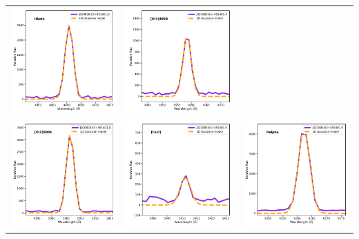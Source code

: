 \documentclass[fleqn,usenatbib]{mnras}
\begin{document}
\begin{table}
\begin{tabular}{l l l }
    \includegraphics[width=0.3\linewidth, clip]{Figs/Obs_Hbeta.pdf} & \includegraphics[width=0.3\linewidth, clip]{Figs/Obs_[OIII]4958.pdf} \\ \includegraphics[width=0.3\linewidth, clip]{Figs/Obs_[OIII]5006.pdf} & \includegraphics[width=0.3\linewidth, clip]{Figs/Obs_[FeIII].pdf} &
    \includegraphics[width=0.3\linewidth, clip]{Figs/Obs_Halpha.pdf} \\
\end{tabular}
\end{table}




\bsp	%
\label{lastpage}
\end{document}
